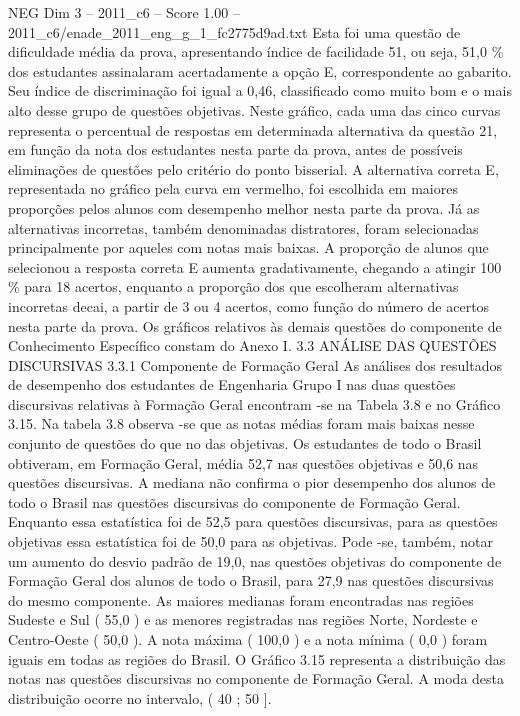 \begin{textsample}{NEG Dim 3 – 2011\_c6 – Score 1.00 – 2011\_c6/enade\_2011\_eng\_g\_1\_fc2775d9ad.txt}
Esta foi uma questão de dificuldade média da prova, apresentando índice de facilidade 51, ou seja, 51,0 \% dos estudantes assinalaram acertadamente a opção E, correspondente ao gabarito.
Seu índice de discriminação foi igual a 0,46, classificado como muito bom e o mais alto desse grupo de questões objetivas.
Neste gráfico, cada uma das cinco curvas representa o percentual de respostas em determinada alternativa da questão 21, em função da nota dos estudantes nesta parte da prova, antes de possíveis eliminações de questões pelo critério do ponto bisserial.
A alternativa correta E, representada no gráfico pela curva em vermelho, foi escolhida em maiores proporções pelos alunos com desempenho melhor nesta parte da prova.
Já as alternativas incorretas, também denominadas distratores, foram selecionadas principalmente por aqueles com notas mais baixas.
A proporção de alunos que selecionou a resposta correta E aumenta gradativamente, chegando a atingir 100 \% para 18 acertos, enquanto a proporção dos que escolheram alternativas incorretas decai, a partir de 3 ou 4 acertos, como função do número de acertos nesta parte da prova.
Os gráficos relativos às demais questões do componente de Conhecimento Específico constam do Anexo I. 3.3 ANÁLISE DAS QUESTÕES DISCURSIVAS 3.3.1 Componente de Formação Geral As análises dos resultados de desempenho dos estudantes de Engenharia Grupo I nas duas questões discursivas relativas à Formação Geral encontram -se na Tabela 3.8 e no Gráfico 3.15.
Na tabela 3.8 observa -se que as notas médias foram mais baixas nesse conjunto de questões do que no das objetivas.
Os estudantes de todo o Brasil obtiveram, em Formação Geral, média 52,7 nas questões objetivas e 50,6 nas questões discursivas.
A mediana não confirma o pior desempenho dos alunos de todo o Brasil nas questões discursivas do componente de Formação Geral.
Enquanto essa estatística foi de 52,5 para questões discursivas, para as questões objetivas essa estatística foi de 50,0 para as objetivas.
Pode -se, também, notar um aumento do desvio padrão de 19,0, nas questões objetivas do componente de Formação Geral dos alunos de todo o Brasil, para 27,9 nas questões discursivas do mesmo componente.
As maiores medianas foram encontradas nas regiões Sudeste e Sul ( 55,0 ) e as menores registradas nas regiões Norte, Nordeste e Centro-Oeste ( 50,0 ).
A nota máxima ( 100,0 ) e a nota mínima ( 0,0 ) foram iguais em todas as regiões do Brasil.
O Gráfico 3.15 representa a distribuição das notas nas questões discursivas no componente de Formação Geral.
A moda desta distribuição ocorre no intervalo, ( 40 ; 50 ].

\end{textsample}
